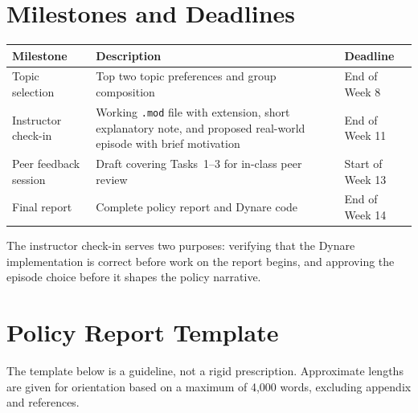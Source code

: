 \documentclass[11pt, a4paper]{article}
\begin{document}
\section{Milestones and Deadlines}
\label{sec:milestones}

\begin{center}
\begin{tabular}{p{3.5cm} p{7.5cm} p{2.7cm}}
\toprule
\textbf{Milestone} & \textbf{Description} & \textbf{Deadline} \\
\midrule
Topic selection
    & Top two topic preferences and group composition
    & End of Week 8 \\[0.5em]
Instructor check-in
    & Working \texttt{.mod} file with extension, short explanatory
      note, and proposed real-world episode with brief motivation
    & End of Week 11 \\[0.5em]
Peer feedback session
    & Draft covering Tasks~1--3 for in-class peer review
    & Start of Week 13 \\[0.5em]
Final report
    & Complete policy report and Dynare code
    & End of Week 14 \\
\bottomrule
\end{tabular}
\end{center}

\bigskip
The instructor check-in serves two purposes: verifying that the Dynare
implementation is correct before work on the report begins, and approving the
episode choice before it shapes the policy narrative.

\section{Policy Report Template}
\label{sec:template}

The template below is a guideline, not a rigid prescription. Approximate lengths
are given for orientation based on a maximum of 4,000 words, excluding appendix
and references.
\end{document}
